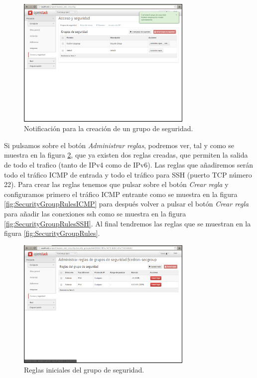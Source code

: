 \documentclass{article}
\begin{document}
\begin{figure}[h]
  \centering
    \includegraphics[width=0.75\textwidth]{img/m_029.png}
  \caption{Notificación para la creación de un grupo de seguridad.}
  \label{fig:SecurityGroupCreate}
\end{figure}	

	Si pulsamos sobre el botón \emph{Administrar reglas}, podremos ver, tal y como se muestra en la figura \ref{fig:SecurityGroupRulesInit}, que ya existen dos reglas creadas, que permiten la salida de todo el trafico (tanto de IPv4 como de IPv6). Las reglas que añadiremos serán todo el tráfico ICMP de entrada y todo el tráfico para SSH (puerto TCP número 22). Para crear las reglas tenemos que pulsar sobre el botón \emph{Crear regla} y configuramos primero el tráfico ICMP entrante como se muestra en la figura \ref{fig:SecurityGroupRulesICMP} para después volver a pulsar el botón \emph{Crear regla} para añadir las conexiones ssh como se muestra en la figura \ref{fig:SecurityGroupRulesSSH}. Al final tendremos las reglas que se muestran en la figura \ref{fig:SecurityGroupRules}.


\begin{figure}[h]
  \centering
    \includegraphics[width=0.75\textwidth]{img/m_030.png}
  \caption{Reglas iniciales del grupo de seguridad.}
  \label{fig:SecurityGroupRulesInit}
\end{figure}	
\end{document}
